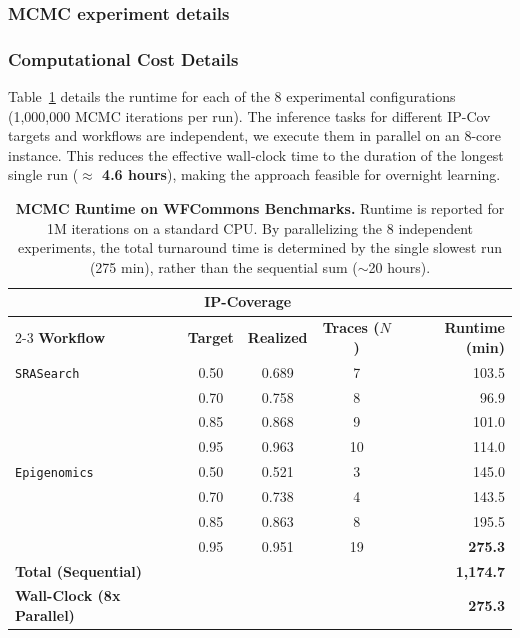 \documentclass{article}
\theoremstyle{plain}
\theoremstyle{definition}
\theoremstyle{remark}
\begin{document}
\subsubsection{MCMC experiment details}\label{app:wfcommons_mcmc}

\subsubsection{Computational Cost Details}\label{app:wfcommons_time}
Table~\ref{tab:runtime_wfcommons} details the runtime for each of the 8 experimental configurations (1,000,000 MCMC iterations per run). The inference tasks for different IP-Cov targets and workflows are independent, we execute them in parallel on an 8-core instance. This reduces the effective wall-clock time to the duration of the longest single run (\textbf{$\approx$ 4.6 hours}), making the approach feasible for overnight learning.

\begin{table}[h!]
\centering
\caption{\textbf{MCMC Runtime on WFCommons Benchmarks.} 
Runtime is reported for 1M iterations on a standard CPU. 
By parallelizing the 8 independent experiments, the total turnaround time is determined by the single slowest run (275 min), rather than the sequential sum ($\sim$20 hours).}
\label{tab:runtime_wfcommons}
\small
\setlength{\tabcolsep}{5pt}
\begin{tabular}{l c c c r}
\toprule
& \multicolumn{2}{c}{\textbf{IP-Coverage}} & & \\
\cmidrule(lr){2-3}
\textbf{Workflow} & \textbf{Target} & \textbf{Realized} & \textbf{Traces ($N$)} & \textbf{Runtime (min)} \\
\midrule
\texttt{SRASearch}   & 0.50 & 0.689 & 7  & 103.5 \\
                     & 0.70 & 0.758 & 8  & 96.9 \\
                     & 0.85 & 0.868 & 9  & 101.0 \\
                     & 0.95 & 0.963 & 10 & 114.0 \\
\midrule
\texttt{Epigenomics} & 0.50 & 0.521 & 3  & 145.0 \\
                     & 0.70 & 0.738 & 4  & 143.5 \\
                     & 0.85 & 0.863 & 8  & 195.5 \\
                     & 0.95 & 0.951 & 19 & \textbf{275.3} \\
\midrule
\textbf{Total (Sequential)} & & & & \textbf{1,174.7} \\
\textbf{Wall-Clock (8x Parallel)} & & & & \textbf{275.3} \\
\bottomrule
\end{tabular}
\end{table}
\end{document}
